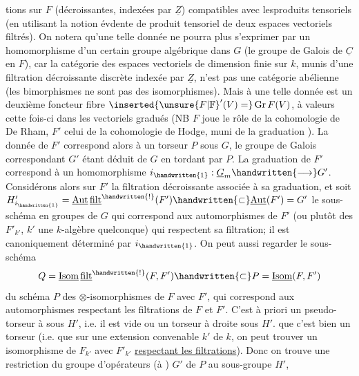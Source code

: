 %
tions sur $F$ (décroissantes,  indexées par $\underline{Z}$) compatibles avec lesproduits tensoriels (en utilisant la notion évdente de produit tensoriel de deux espaces vectoriels filtrés). On notera qu'une telle donnée ne pourra plus s'exprimer par un homomorphisme d'un certain groupe algébrique dans $G$ (le groupe de Galois de $\underline{C}$ en $F$), car la catégorie des espaces vectoriels de dimension finie sur $k$, munis d'une filtration décroissante discrète indexée par $\underline{Z}$, n'est pas une catégorie abélienne (les bimorphismes ne sont pas des isomorphismes\handwritten{!}). Mais à une telle donnée est  un deuxième foncteur fibre $\inserted{\unsure{F|\mathbb{F}}'(V)=}\operatorname{Gr}F(V)$, à valeurs cette fois-ci dans les vectoriels gradués (NB $F$ joue le rôle de la cohomologie de  De Rham, $F'$ celui de la cohomologie de Hodge\deleted{\unsure{)}}, muni de la graduation ). La donnée de $F'$ correspond alors à un torseur  $P$ sous $G$, le groupe de Galois correspondant $G'$ étant déduit de $G$ en tordant par $P$. La graduation de $F'$ correspond à un homomorphisme $i_{\handwritten{1}}:\underline{G}_m\handwritten{\longrightarrow}G'$. Considérons alors sur $F'$ la filtration décroissante associée à sa graduation, et soit $H'_{i_{\handwritten{1}}}=\underline{\operatorname{Aut}}\,\underline{\mathrm{filt}}^{\handwritten{!}}(F')\handwritten{\subset}\underline{\operatorname{Aut}}(F')=G'$ le sous-schéma en groupes de $G$ qui correspond aux \inserted{$\unsure{\otimes|\Omega}$-}automorphismes de $F'$ (ou plutôt des $F'_{k'}$, $k'$ une $k$-algèbre quelconque) qui respectent sa filtration; il est canoniquement déterminé par $i_{\handwritten{1}}$. On peut aussi regarder le sous-schéma
\[
Q=\underline{\operatorname{Isom}}\,\underline{\mathrm{filt}}^{\handwritten{!}}(F,F')\handwritten{\subset}P=\underline{\operatorname{Isom}}(F,F')
\]
du schéma $P$ des $\otimes$-isomorphismes de $F$ avec $F'$,  qui correspond aux automorphismes respectant les filtrations de $F$ et $F'$. C'est à priori un pseudo-torseur à  sous $H'$, i.e. il est vide ou un torseur à droite sous $H'$.  que c'est bien un torseur (i.e. que sur une extension convenable $k'$ de $k$, on peut trouver un isomorphisme de $F_{k'}$ avec $F'_{k'}$ \uline{respectant les filtrations}). Donc on trouve une restriction du groupe d'opérateurs (à ) $G'$ de $P$ au sous-groupe $H'$,
